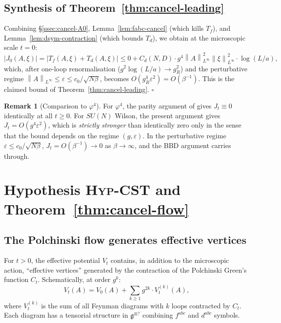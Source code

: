 \documentclass[11pt,a4paper]{amsart}
\theoremstyle{definition}
\newtheorem{remark}[theorem]{Remark}
\newcommand{\gfrak}{\mathfrak{g}}
\newcommand{\norm}[1]{\left\lVert#1\right\rVert}
\begin{document}
\subsection{Synthesis of Theorem~\ref{thm:cancel-leading}}

Combining \S\ref{ssec:cancel-A0}, Lemma~\ref{lem:fabc-cancel} (which
kills $T_f$), and Lemma~\ref{lem:dsym-contraction} (which bounds $T_d$),
we obtain at the microscopic scale $t = 0$:
\[
\bigl|J_0(A,\xi)\bigr| = \bigl|T_f(A,\xi) + T_d(A,\xi)\bigr|
\leq 0 + C_d(N, D) \cdot g^4 \norm{A}^2_{L^\infty} \norm{\xi}^2_{L^\infty} \cdot \log(L/a),
\]
which, after one-loop renormalisation ($g^2 \log(L/a) \to g_R^2$) and the
perturbative regime $\norm{A}_{L^\infty} \leq \varepsilon \leq c_0/\sqrt{N\beta}$,
becomes $O(g_R^4 \varepsilon^2) = O(\beta^{-1})$. This is the claimed bound
of Theorem~\ref{thm:cancel-leading}. \hfill $\square$

\begin{remark}[Comparison to $\varphi^4$]\label{rem:phi4-comparison}
For $\varphi^4$, the parity argument of \cite[\S 4.1]{BauerschmidtDagallier2024}
gives $J_t \equiv 0$ identically at all $t \geq 0$. For $SU(N)$ Wilson, the
present argument gives $J_t = O(g^4 \varepsilon^2)$, which is
\emph{strictly stronger} than identically zero only in the sense that
the bound depends on the regime $(g, \varepsilon)$. In the perturbative
regime $\varepsilon \leq c_0/\sqrt{N\beta}$, $J_t = O(\beta^{-1}) \to 0$
as $\beta \to \infty$, and the BBD argument carries through.
\end{remark}

\section{Hypothesis \textsc{Hyp-CST} and Theorem~\ref{thm:cancel-flow}}\label{sec:Hyp-CST}

\subsection{The Polchinski flow generates effective vertices}

For $t > 0$, the effective potential $V_t$ contains, in addition to the
microscopic action, ``effective vertices'' generated by the contraction
of the Polchinski Green's function $C_t$. Schematically, at order $g^k$:
\[
V_t(A) = V_0(A) + \sum_{k \geq 1} g^{2k} \cdot V_t^{(k)}(A),
\]
where $V_t^{(k)}$ is the sum of all Feynman diagrams with $k$ loops contracted
by $C_t$. Each diagram has a tensorial structure in $\gfrak^{\otimes ?}$
combining $f^{abc}$ and $d^{abc}$ symbols.
\end{document}
